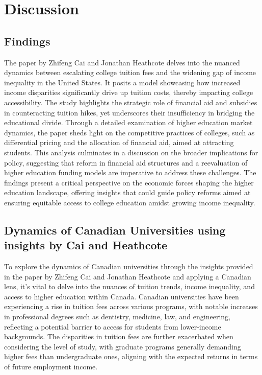 \documentclass[
  letterpaper,
  DIV=11,
  numbers=noendperiod]{scrartcl}
\begin{document}
\section{Discussion}\label{discussion}

\subsection{Findings}\label{findings}

The paper by Zhifeng Cai and Jonathan Heathcote delves into the nuanced
dynamics between escalating college tuition fees and the widening gap of
income inequality in the United States. It posits a model showcasing how
increased income disparities significantly drive up tuition costs,
thereby impacting college accessibility. The study highlights the
strategic role of financial aid and subsidies in counteracting tuition
hikes, yet underscores their insufficiency in bridging the educational
divide. Through a detailed examination of higher education market
dynamics, the paper sheds light on the competitive practices of
colleges, such as differential pricing and the allocation of financial
aid, aimed at attracting students. This analysis culminates in a
discussion on the broader implications for policy, suggesting that
reform in financial aid structures and a reevaluation of higher
education funding models are imperative to address these challenges. The
findings present a critical perspective on the economic forces shaping
the higher education landscape, offering insights that could guide
policy reforms aimed at ensuring equitable access to college education
amidst growing income inequality.

\subsection{Dynamics of Canadian Universities using insights by Cai and
Heathcote}\label{dynamics-of-canadian-universities-using-insights-by-cai-and-heathcote}

To explore the dynamics of Canadian universities through the insights
provided in the paper by Zhifeng Cai and Jonathan Heathcote and applying
a Canadian lens, it's vital to delve into the nuances of tuition trends,
income inequality, and access to higher education within Canada.
Canadian universities have been experiencing a rise in tuition fees
across various programs, with notable increases in professional degrees
such as dentistry, medicine, law, and engineering, reflecting a
potential barrier to access for students from lower-income backgrounds.
The disparities in tuition fees are further exacerbated when considering
the level of study, with graduate programs generally demanding higher
fees than undergraduate ones, aligning with the expected returns in
terms of future employment income.
\end{document}
